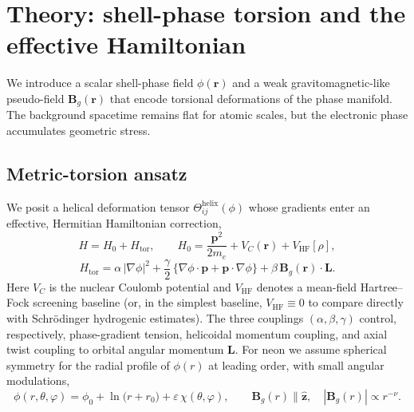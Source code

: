 \documentclass[12pt]{article}
\begin{document}
\section{Theory: shell-phase torsion and the effective Hamiltonian}
We introduce a scalar shell-phase field $\phi(\bm{r})$ and a weak gravitomagnetic-like pseudo-field $\bm{B}_g(\bm{r})$ that encode torsional deformations of the phase manifold. The background spacetime remains flat for atomic scales, but the electronic phase accumulates geometric stress.

\subsection{Metric-torsion ansatz}
We posit a helical deformation tensor $\Theta_{ij}^{\mathrm{helix}}(\phi)$ whose gradients enter an effective, Hermitian Hamiltonian correction,
\begin{equation}
H = H_0 + H_{\mathrm{tor}}, \qquad
H_0 = \frac{\bm{p}^2}{2m_e} + V_C(\bm{r}) + V_{\mathrm{HF}}[\rho],
\end{equation}
\begin{equation}
H_{\mathrm{tor}} = \alpha\,|\nabla \phi|^2 + \frac{\gamma}{2}\,\big\{\nabla \phi \cdot \bm{p} + \bm{p}\cdot \nabla \phi \big\} + \beta\,\bm{B}_g(\bm{r})\cdot \bm{L}.
\label{eq:torHam}
\end{equation}
Here $V_C$ is the nuclear Coulomb potential and $V_{\mathrm{HF}}$ denotes a mean-field Hartree--Fock screening baseline (or, in the simplest baseline, $V_{\mathrm{HF}}\equiv 0$ to compare directly with Schrödinger hydrogenic estimates). The three couplings $(\alpha,\beta,\gamma)$ control, respectively, phase-gradient tension, helicoidal momentum coupling, and axial twist coupling to orbital angular momentum $\bm{L}$. For neon we assume spherical symmetry for the radial profile of $\phi(r)$ at leading order, with small angular modulations,
\begin{equation}
\phi(r,\theta,\varphi) = \phi_0 + \ln\!\big(r + r_0\big) + \varepsilon\,\chi(\theta,\varphi), \qquad \bm{B}_g(r)\parallel \hat{\bm{z}}, \quad |\bm{B}_g(r)| \propto r^{-\nu}.
\end{equation}
\end{document}
